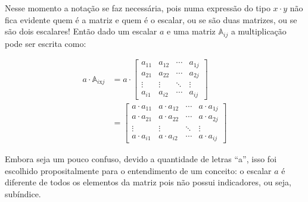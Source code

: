 Nesse momento a notação se faz necessária, pois numa expressão do tipo $x \cdot y$ não fica evidente quem é a matriz e quem é o escalar,
ou se são duas matrizes, ou se são dois escalares! Então dado um escalar $a$ e uma matriz $\mathbb{A}_{ij}$ a multiplicação pode ser escrita
como:


\begin{ceqn}
	\begin{align*}
		a\cdot\mathbb{A}_{i\mathrm{x}j} & =  a\cdot\begin{bmatrix}a_{11} & a_{12} & \cdots & a_{1j}\\
	a_{21} & a_{22} & \cdots & a_{2j}\\
	\vdots & \vdots & \ddots & \vdots\\
	a_{i1} & a_{i2} & \cdots & a_{ij}
	\end{bmatrix}\\
	& =  \begin{bmatrix}a\cdot a_{11} & a\cdot a_{12} & \cdots & a\cdot a_{1j}\\
	a\cdot a_{21} & a\cdot a_{22} & \cdots & a\cdot a_{2j}\\
	\vdots & \vdots & \ddots & \vdots\\
	a\cdot a_{i1} & a\cdot a_{i2} & \cdots & a\cdot a_{ij}
	\end{bmatrix}
	\end{align*}
\end{ceqn}

Embora seja um pouco confuso, devido a quantidade de letras ``a'', isso foi escolhido propositalmente para o entendimento de um conceito: o escalar $a$ é diferente de todos os elementos da matriz pois não possui indicadores, ou seja, subíndice.


